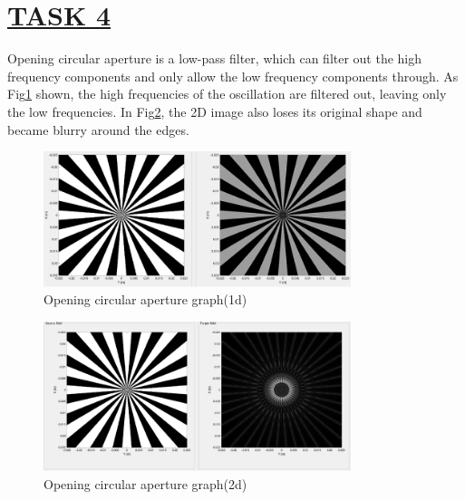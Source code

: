 \documentclass[fontsize=11pt]{scrartcl}
\begin{document}
\section{\uline{TASK 4}}
Opening circular aperture is a low-pass filter, which can filter out 
the high frequency components and only allow the low frequency components through. 
As Fig\ref{fig4.1} shown, the high frequencies of the oscillation are filtered out, 
leaving only the low frequencies. In Fig\ref{fig4.2}, the 2D image also loses its original shape 
and became blurry around the edges. 
\begin{figure}[H]
    \centering
     \includegraphics[width=0.8\textwidth]{img/7_1.png}
     \caption{Opening circular aperture graph(1d)}
     \label{fig4.1}
\end{figure}
\begin{figure}[H]
    \centering
     \includegraphics[width=0.8\textwidth]{img/7_2.png}
     \caption{Opening circular aperture graph(2d)}
     \label{fig4.2}
\end{figure}
\end{document}
